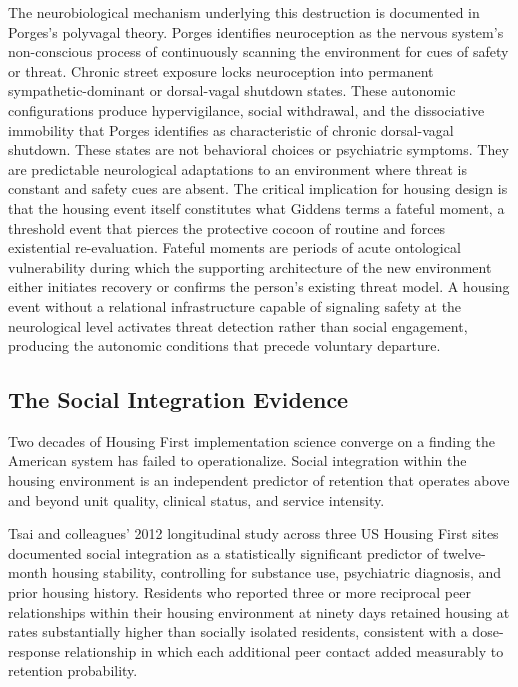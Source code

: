 \documentclass[12pt, letterpaper]{article}
\begin{document}
The neurobiological mechanism underlying this destruction is documented in Porges's polyvagal theory. Porges identifies neuroception as the nervous system's non-conscious process of continuously scanning the environment for cues of safety or threat. Chronic street exposure locks neuroception into permanent sympathetic-dominant or dorsal-vagal shutdown states. These autonomic configurations produce hypervigilance, social withdrawal, and the dissociative immobility that Porges identifies as characteristic of chronic dorsal-vagal shutdown. These states are not behavioral choices or psychiatric symptoms. They are predictable neurological adaptations to an environment where threat is constant and safety cues are absent. The critical implication for housing design is that the housing event itself constitutes what Giddens terms a fateful moment, a threshold event that pierces the protective cocoon of routine and forces existential re-evaluation. Fateful moments are periods of acute ontological vulnerability during which the supporting architecture of the new environment either initiates recovery or confirms the person's existing threat model. A housing event without a relational infrastructure capable of signaling safety at the neurological level activates threat detection rather than social engagement, producing the autonomic conditions that precede voluntary departure.

\subsection{The Social Integration Evidence}

Two decades of Housing First implementation science converge on a finding the American system has failed to operationalize. Social integration within the housing environment is an independent predictor of retention that operates above and beyond unit quality, clinical status, and service intensity.

Tsai and colleagues' 2012 longitudinal study across three US Housing First sites documented social integration as a statistically significant predictor of twelve-month housing stability, controlling for substance use, psychiatric diagnosis, and prior housing history. Residents who reported three or more reciprocal peer relationships within their housing environment at ninety days retained housing at rates substantially higher than socially isolated residents, consistent with a dose-response relationship in which each additional peer contact added measurably to retention probability.
\end{document}

